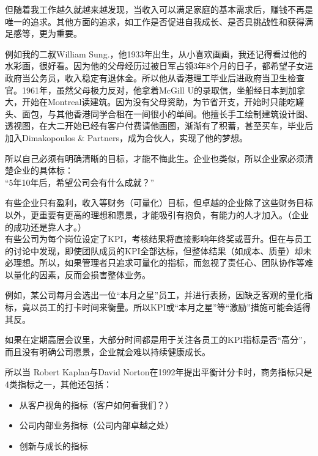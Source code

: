 但随着我工作越久就越来越发现，当收入可以满足家庭的基本需求后，赚钱不再是唯一的追求。其他方面的追求，如工作是否促进自我成长、是否具挑战性和获得满足感等，更为重要。

例如我的二叔William
Sung.，他1933年出生，从小喜欢画画，我还记得看过他的水彩画，很好看。因为他的父母经历过被日军占领3年8个月的日子，都希望子女进政府当公务员，收入稳定有退休金。所以他从香港理工毕业后进政府当卫生检查官。1961年，虽然父母极力反对，他拿着McGill
U的录取信，坐船经日本到加拿大，开始在Montreal读建筑。因为没有父母资助，为节省开支，开始时只能吃罐头、面包，与其他香港同学合租在一间很小的单间。他擅长手工绘制建筑设计图、透视图，在大二开始已经有客户付费请他画图，渐渐有了积蓄，甚至买车，毕业后加入Dimakopoulos
\& Partners，成为合伙人，实现了他的梦想。

所以自己必须有明确清晰的目标，才能不悔此生。企业也类似，所以企业家必须清楚企业的具体标：\\
``5年10年后，希望公司会有什么成就？''

有些企业只有盈利，收入等财务（可量化）目标，但卓越的企业除了这些财务目标以外，更重要有更高的理想和愿景，才能吸引有抱负，有能力的人才加入。（企业的成功还是靠人才。）\\
有些公司为每个岗位设定了KPI，考核结果将直接影响年终奖或晋升。但在与员工的讨论中发现，即使团队成员的KPI全部达标，但整体结果（如成本、质量）却未必理想。所以，如果管理者只追求可量化的指标，而忽视了责任心、团队协作等难以量化的因素，反而会损害整体业务。

例如，某公司每月会选出一位``本月之星''员工，并进行表扬，因缺乏客观的量化指标，竟以员工的打卡时间来衡量。所以KPI或``本月之星''等``激励''措施可能会适得其反。

如果在定期高层会议里，大部分时间都是用于关注各员工的KPI指标是否``高分''，而且没有明确公司愿景，企业就会难以持续健康成长。

所以当 Robert Kaplan与David
Norton在1992年提出平衡计分卡时，商务指标只是4类指标之一，其他还包括：

\begin{itemize}
\tightlist
\item
  从客户视角的指标（客户如何看我们？）
\item
  公司内部业务指标（公司内部卓越之处）
\item
  创新与成长的指标
\end{itemize}


